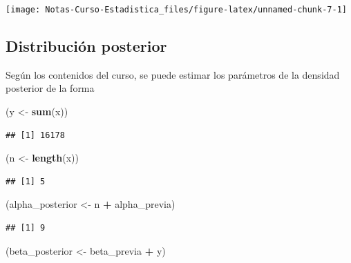 \documentclass[
  12pt,
]{book}
\newenvironment{Shaded}{\begin{snugshade}}{\end{snugshade}}
\newcommand{\KeywordTok}[1]{\textcolor[rgb]{0.13,0.29,0.53}{\textbf{#1}}}
\newcommand{\NormalTok}[1]{#1}
\newcommand{\OperatorTok}[1]{\textcolor[rgb]{0.81,0.36,0.00}{\textbf{#1}}}
\newcommand{\StringTok}[1]{\textcolor[rgb]{0.31,0.60,0.02}{#1}}
\begin{document}
\begin{center}\texttt{[image: Notas-Curso-Estadistica\_files/figure-latex/unnamed-chunk-7-1]} \end{center}

\hypertarget{distribuciuxf3n-posterior}{%
\subsection{Distribución posterior}\label{distribuciuxf3n-posterior}}

Según los contenidos del curso, se puede estimar los parámetros de la densidad posterior de la forma

\begin{Shaded}
\begin{Highlighting}[]
\NormalTok{(y  \textless{}{-}}\StringTok{ }\KeywordTok{sum}\NormalTok{(x))}
\end{Highlighting}
\end{Shaded}

\begin{verbatim}
## [1] 16178
\end{verbatim}

\begin{Shaded}
\begin{Highlighting}[]
\NormalTok{(n \textless{}{-}}\StringTok{ }\KeywordTok{length}\NormalTok{(x))}
\end{Highlighting}
\end{Shaded}

\begin{verbatim}
## [1] 5
\end{verbatim}

\begin{Shaded}
\begin{Highlighting}[]
\NormalTok{(alpha\_posterior \textless{}{-}}\StringTok{ }\NormalTok{n }\OperatorTok{+}\StringTok{ }\NormalTok{alpha\_previa)}
\end{Highlighting}
\end{Shaded}

\begin{verbatim}
## [1] 9
\end{verbatim}

\begin{Shaded}
\begin{Highlighting}[]
\NormalTok{(beta\_posterior \textless{}{-}}\StringTok{ }\NormalTok{beta\_previa }\OperatorTok{+}\StringTok{ }\NormalTok{y)}
\end{Highlighting}
\end{Shaded}
\end{document}
